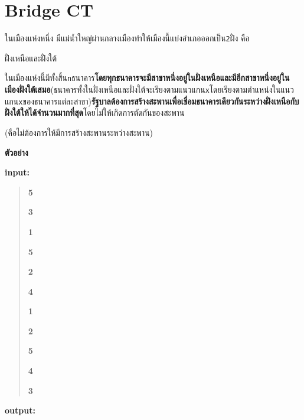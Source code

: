 \documentclass{article}
\begin{document}
\section*{Bridge  {CT}}

ในเมืองแห่งหนึ่ง มีแม่น้ำใหญ่ผ่านกลางเมืองทำให้เมืองนี้แบ่งอำเภอออกเป็น\texttt{2}ฝั่ง คือ

ฝั่งเหนือและฝั่งใต้

ในเมืองแห่งนี้มีทั้งสิ้น\texttt{n}ธนาคาร\textbf{โดยทุกธนาคารจะมีสาขาหนึ่งอยู่ในฝั่งเหนือและมีอีกสาขาหนึ่งอยู่ในเมืองฝั่งใต้เสมอ}(ธนาคารทั้งในฝั่งเหนือและฝั่งใต้จะเรียงตามแนวแกน\texttt{x}โดยเรียงตามตำแหน่งในแนวแกน\texttt{x}ของธนาคารแต่ละสาขา)\textbf{รัฐบาลต้องการสร้างสะพานเพื่อเชื่อมธนาคารเดียวกันระหว่างฝั่งเหนือกับฝั่งใต้ให้ได้จำนวนมากที่สุด}โดยไม่ให้เกิดการตัดกันของสะพาน

(คือไม่ต้องการให้มีการสร้างสะพานระหว่างสะพาน)\\



\hfill\break



\textbf{ตัวอย่าง}



\textbf{input:}



\begin{quote}

\textbf{5}



\textbf{3}



\textbf{1}



\textbf{5}



\textbf{2}



\textbf{4}



\textbf{1}



\textbf{2}



\textbf{5}



\textbf{4}



\textbf{3}

\end{quote}



\textbf{output:}
\end{document}
